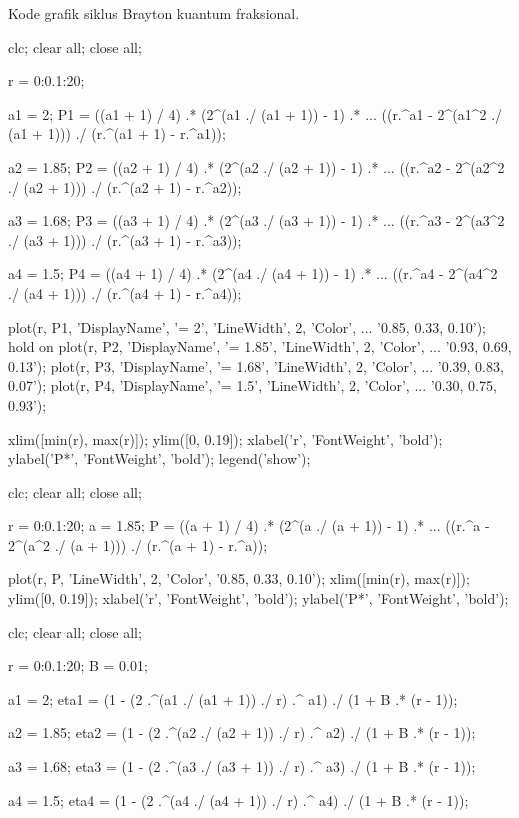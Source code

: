 Kode grafik siklus Brayton kuantum fraksional.
\begin{verbatim*}
clc; clear all; close all;

r = 0:0.1:20;

a1 = 2;
P1 = ((a1 + 1) / 4) .* (2^(a1 ./ (a1 + 1)) - 1) .* ...
     ((r.^a1 - 2^(a1^2 ./ (a1 + 1))) ./ (r.^(a1 + 1) - r.^a1));

a2 = 1.85;
P2 = ((a2 + 1) / 4) .* (2^(a2 ./ (a2 + 1)) - 1) .* ...
     ((r.^a2 - 2^(a2^2 ./ (a2 + 1))) ./ (r.^(a2 + 1) - r.^a2));

a3 = 1.68;
P3 = ((a3 + 1) / 4) .* (2^(a3 ./ (a3 + 1)) - 1) .* ...
     ((r.^a3 - 2^(a3^2 ./ (a3 + 1))) ./ (r.^(a3 + 1) - r.^a3));

a4 = 1.5;
P4 = ((a4 + 1) / 4) .* (2^(a4 ./ (a4 + 1)) - 1) .* ...
     ((r.^a4 - 2^(a4^2 ./ (a4 + 1))) ./ (r.^(a4 + 1) - r.^a4));

plot(r, P1, 'DisplayName', '\alpha = 2', 'LineWidth', 2, 'Color', ...
    '0.85, 0.33, 0.10');
hold on
plot(r, P2, 'DisplayName', '\alpha = 1.85', 'LineWidth', 2, 'Color', ...
    '0.93, 0.69, 0.13');
plot(r, P3, 'DisplayName', '\alpha = 1.68', 'LineWidth', 2, 'Color', ...
    '0.39, 0.83, 0.07');
plot(r, P4, 'DisplayName', '\alpha = 1.5', 'LineWidth', 2, 'Color', ...
    '0.30, 0.75, 0.93');

xlim([min(r), max(r)]);
ylim([0, 0.19]);
xlabel('r', 'FontWeight', 'bold');
ylabel('P*', 'FontWeight', 'bold');
legend('show');

clc; clear all; close all;

r = 0:0.1:20;
a = 1.85;
P = ((a + 1) / 4) .* (2^(a ./ (a + 1)) - 1) .* ...
    ((r.^a - 2^(a^2 ./ (a + 1))) ./ (r.^(a + 1) - r.^a));

plot(r, P, 'LineWidth', 2, 'Color', '0.85, 0.33, 0.10');
xlim([min(r), max(r)]);
ylim([0, 0.19]);
xlabel('r', 'FontWeight', 'bold');
ylabel('P*', 'FontWeight', 'bold');

clc; clear all; close all;

r = 0:0.1:20;
B = 0.01;

a1 = 2;
eta1 = (1 - (2 .^(a1 ./ (a1 + 1)) ./ r) .^ a1) ./ (1 + B .* (r - 1));

a2 = 1.85;
eta2 = (1 - (2 .^(a2 ./ (a2 + 1)) ./ r) .^ a2) ./ (1 + B .* (r - 1));

a3 = 1.68;
eta3 = (1 - (2 .^(a3 ./ (a3 + 1)) ./ r) .^ a3) ./ (1 + B .* (r - 1));

a4 = 1.5;
eta4 = (1 - (2 .^(a4 ./ (a4 + 1)) ./ r) .^ a4) ./ (1 + B .* (r - 1));


\end{verbatim*}
